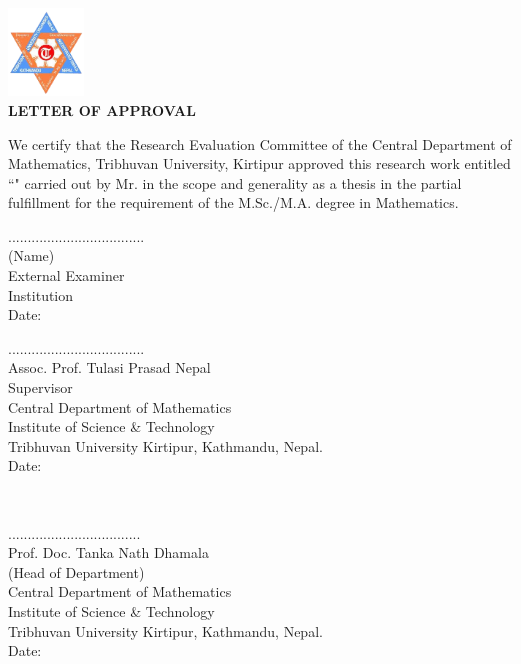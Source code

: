 
 \begin{center}
 	\includegraphics[width=0.15\textwidth]{pictures/tulogo.png}\\[1.5cm]
 {\Large{\bfseries{LETTER OF APPROVAL}}}\\[.5cm]
\end{center}

\noindent
We certify that the Research Evaluation Committee of the Central Department of Mathematics, Tribhuvan University, Kirtipur approved this research work entitled ``\textbf{\thetitle}" carried out by Mr. \textbf{\theauthor} in the scope and generality as a thesis in the partial fulfillment for the requirement of the M.Sc./M.A. degree in Mathematics.
\\[3.5cm]
\begin{minipage}{0.45\textwidth}
		...................................\\
		(Name) \\
		External Examiner\\
		Institution \\[0.1cm]
		Date:
\end{minipage}
%
\begin{minipage}{0.6\textwidth}
	...................................\\
		Assoc. Prof. Tulasi Prasad Nepal \\
		Supervisor \\
		Central Department of Mathematics\\
                Institute of Science \& Technology\\
                Tribhuvan University
                Kirtipur, Kathmandu, Nepal.\\[0.1cm]
		Date: \thedate

\end{minipage}\\[3cm]

\begin{center}
..................................\\
Prof. Doc. Tanka Nath Dhamala\\
	(Head of Department)\\
 Central Department of Mathematics\\
	 Institute of Science \& Technology\\
	 Tribhuvan University
	  Kirtipur, Kathmandu, Nepal.\\
	Date: \thedate
\end{center}
